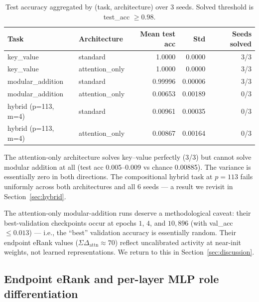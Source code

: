 \documentclass{article}
\begin{document}
\begin{table}[h]
    \centering
    \caption{Test accuracy aggregated by (task, architecture) over 3 seeds. Solved threshold is test\_acc $\ge 0.98$.}
    \label{tab:core-acc}
    \small
    \begin{tabular}{llrrr}
        \toprule
        Task & Architecture & Mean test acc & Std & Seeds solved \\
        \midrule
        key\_value & standard & 1.0000 & 0.0000 & 3/3 \\
        key\_value & attention\_only & 1.0000 & 0.0000 & 3/3 \\
        modular\_addition & standard & 0.99996 & 0.00006 & 3/3 \\
        modular\_addition & attention\_only & 0.00653 & 0.00189 & 0/3 \\
        hybrid (p=113, m=4) & standard & 0.00961 & 0.00035 & 0/3 \\
        hybrid (p=113, m=4) & attention\_only & 0.00867 & 0.00164 & 0/3 \\
        \bottomrule
    \end{tabular}
\end{table}

The attention-only architecture solves key--value perfectly (3/3) but cannot solve modular addition at all (test acc 0.005--0.009 vs chance 0.00885). The variance is essentially zero in both directions. The compositional hybrid task at $p=113$ fails uniformly across both architectures and all 6 seeds --- a result we revisit in Section~\ref{sec:hybrid}.

The attention-only modular-addition runs deserve a methodological caveat: their best-validation checkpoints occur at epochs $1$, $4$, and $10{,}896$ (with val\_acc $\le 0.013$) --- i.e., the ``best'' validation accuracy is essentially random. Their endpoint eRank values ($\Sigma\Delta_{\text{attn}}\approx 70$) reflect uncalibrated activity at near-init weights, not learned representations. We return to this in Section~\ref{sec:discussion}.

\subsection{Endpoint eRank and per-layer MLP role differentiation}
\label{sec:erank-attribution}
\end{document}

